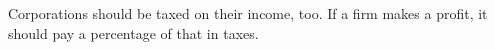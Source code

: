 Corporations should be taxed on their income, too. If a firm makes a profit, it should pay a percentage of that in taxes.
